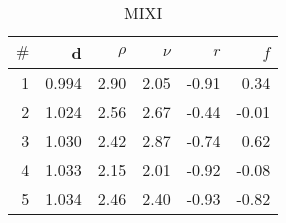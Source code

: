 \documentclass[uplatex,11pt,openany]{ujreport}
\begin{document}
\begin{landscape}
\begin{table*}[tb]
\begin{subtable}[h]{0.3\textwidth}
                    \end{subtable}\hfill\begin{subtable}[h]{0.3\textwidth}
                    \centering
                    \caption{MIXI}
                    \label{table:best_genes_for_mixi}
                    \begin{tabular}{rrrrrr}
                    \toprule
                    $\#$ & d & $\rho$ & $\nu$ & $r$ & $f$ \\
                    \midrule
                    \color{black} 1 & \color{black} 0.994 & {\cellcolor[HTML]{F5FBF6}} \color[HTML]{000000} \color{black} 2.90 & {\cellcolor[HTML]{FAFDFA}} \color[HTML]{000000} \color{black} 2.05 & {\cellcolor[HTML]{FFFAFA}} \color[HTML]{000000} \color{black} -0.91 & {\cellcolor[HTML]{FDADAD}} \color[HTML]{000000} \color{black} 0.34 \\
                    \color{black} 2 & \color{black} 1.024 & {\cellcolor[HTML]{F7FCF8}} \color[HTML]{000000} \color{black} 2.56 & {\cellcolor[HTML]{F6FCF7}} \color[HTML]{000000} \color{black} 2.67 & {\cellcolor[HTML]{FEDDDD}} \color[HTML]{000000} \color{black} -0.44 & {\cellcolor[HTML]{FEC2C2}} \color[HTML]{000000} \color{black} -0.01 \\
                    \color{black} 3 & \color{black} 1.030 & {\cellcolor[HTML]{F8FCF8}} \color[HTML]{000000} \color{black} 2.42 & {\cellcolor[HTML]{F5FBF6}} \color[HTML]{000000} \color{black} 2.87 & {\cellcolor[HTML]{FFEFEF}} \color[HTML]{000000} \color{black} -0.74 & {\cellcolor[HTML]{FD9B9B}} \color[HTML]{000000} \color{black} 0.62 \\
                    \color{black} 4 & \color{black} 1.033 & {\cellcolor[HTML]{F9FDF9}} \color[HTML]{000000} \color{black} 2.15 & {\cellcolor[HTML]{FAFDFA}} \color[HTML]{000000} \color{black} 2.01 & {\cellcolor[HTML]{FFFBFB}} \color[HTML]{000000} \color{black} -0.92 & {\cellcolor[HTML]{FEC7C7}} \color[HTML]{000000} \color{black} -0.08 \\
                    \color{black} 5 & \color{black} 1.034 & {\cellcolor[HTML]{F8FCF8}} \color[HTML]{000000} \color{black} 2.46 & {\cellcolor[HTML]{F8FCF8}} \color[HTML]{000000} \color{black} 2.40 & {\cellcolor[HTML]{FFFBFB}} \color[HTML]{000000} \color{black} -0.93 & {\cellcolor[HTML]{FFF4F4}} \color[HTML]{000000} \color{black} -0.82 \\
                    \bottomrule
                    \end{tabular}
                \end{subtable}\hfill\end{table*}
            \end{landscape}
\end{document}
